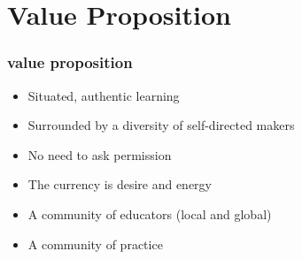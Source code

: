 \section{Value Proposition}
\begin{comment}
* Why make the connection?
** Legitimate Peripheral Participation & situated learning
*** Students can engage -- the currency is desire and energy
** Community of educators
*** Local (institutional)
*** Global (distributed)
*** A community of practice as opposed to a research community
\end{comment}

\begin{frame} 
\frametitle{value proposition}
\begin{itemize}
	\item Situated, authentic learning
	\item Surrounded by a diversity of self-directed makers
	\item No need to ask permission
	\item The currency is desire and energy
	\item A community of educators (local and global)
	\item A community of practice %
\end{itemize}
\end{frame}
